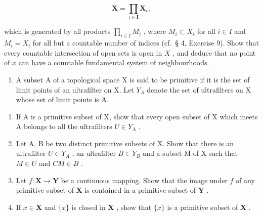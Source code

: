 \[
\mathbf {X} = \prod_ {\iota \in \mathbf {I}} \mathbf {X} _ {\iota},
\]

which is generated by all products \(\prod_{i\in I}M_i\) , where \(M_i\subset X_i\) for all \(i\in I\) and \(M_i = X_i\) for all but a countable number of indices (cf.~§ 4, Exercise 9). Show that every countable intersection of open sets is open in \(X\) , and deduce that no point of \(x\) can have a countable fundamental system of neighbourhoods.

\begin{enumerate}
\def\labelenumi{\arabic{enumi})}
\setcounter{enumi}{6}
\tightlist
\item
  A subset A of a topological space X is said to be primitive if it is the set of limit points of an ultrafilter on X. Let \(Y_{A}\) denote the set of ultrafilters on X whose set of limit points is A.
\end{enumerate}

\begin{enumerate}
\def\labelenumi{\alph{enumi})}
\item
  If A is a primitive subset of X, show that every open subset of X which meets A belongs to all the ultrafilters \(U \in Y_{A}\) .
\item
  Let A, B be two distinct primitive subsets of X. Show that there is an ultrafilter \(U \in Y_{A}\) , an ultrafilter \(B \in Y_{B}\) and a subset M of X such that \(M \in U\) and \(CM \in B\) .
\item
  Let \(f: \mathbf{X} \to \mathbf{Y}\) be a continuous mapping. Show that the image under \(f\) of any primitive subset of \(\mathbf{X}\) is contained in a primitive subset of \(\mathbf{Y}\) .
\item
  If \(x \in \mathbf{X}\) and \(\{x\}\) is closed in \(\mathbf{X}\) , show that \(\{x\}\) is a primitive subset of \(\mathbf{X}\) .
\end{enumerate}


